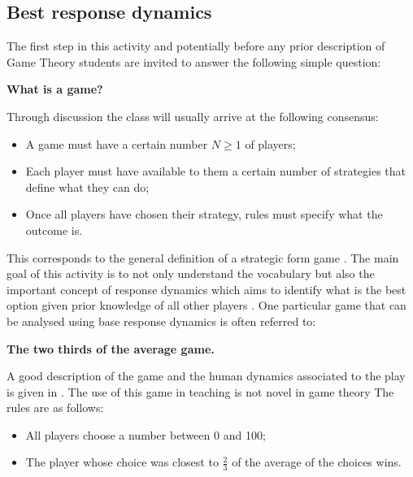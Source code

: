 \documentclass{article}
\begin{document}
\subsection{Best response dynamics}\label{sec:best_responses}

The first step in this activity and potentially before any prior description of
Game Theory students are invited to answer the following simple question:

\begin{center}
    \textbf{What is a game?}
\end{center}

Through discussion the class will usually arrive at the following consensus:

\begin{itemize}
    \item A game must have a certain number \(N\geq 1\) of players;
    \item Each player must have available to them a certain number of strategies
        that define what they can do;
    \item Once all players have chosen their strategy, rules must specify what
        the outcome is.
\end{itemize}

This corresponds to the general definition of a strategic form game
\cite{Maschler2013}. The main goal of this activity is to not only understand
the vocabulary but also the important concept of response dynamics which aims
to identify what is the best option given prior knowledge of all other players
\cite{Maschler2013}. One particular game that can be analysed using base
response dynamics is often referred to:

\begin{center}
    \textbf{The two thirds of the average game.}
\end{center}

A good description of the game and the human dynamics associated to the play is
given in \cite{Nagel1995}.  The use of this game in teaching is not novel in
game theory \cite{TheEconomicsNetwork2013}
The rules are as follows:

\begin{itemize}
    \item All players choose a number between 0 and 100;
    \item The player whose choice was closest to \(\frac{2}{3}\) of the average
        of the choices wins.
\end{itemize}
\end{document}
